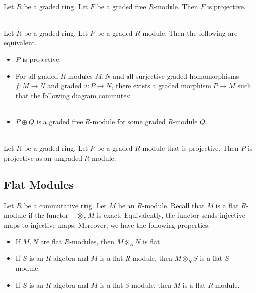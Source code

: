 \documentclass[a4paper]{article}
\begin{document}
\begin{lmm}{}{}\\
Let $R$ be a graded ring. Let $F$ be a graded free $R$-module. Then $F$ is projective. 
\end{lmm}

\begin{prp}{}{}\\
Let $R$ be a graded ring. Let $P$ be a graded $R$-module. Then the following are equivalent. 
\begin{itemize}
\item $P$ is projective. 
\item For all graded $R$-modules $M,N$ and all surjective graded homomorphisms $f:M\to N$ and graded $u:P\to N$, there exists a graded morphism $P\to M$ such that the following diagram commutes: \\
\\
\item $P\oplus Q$ is a graded free $R$-module for some graded $R$-module $Q$. 
\end{itemize}
\end{prp}

\begin{prp}{}{}\\
Let $R$ be a graded ring. Let $P$ be a graded $R$-module that is projective. Then $P$ is projective as an ungraded $R$-module. 
\end{prp}

\subsection{Flat Modules}
Let $R$ be a commutative ring. Let $M$ be an $R$-module. Recall that $M$ is a flat $R$-module if the functor $-\otimes_R M$ is exact. Equivalently, the functor sends injective maps to injective maps. Moreover, we have the following properties: 
\begin{itemize}
\item If $M,N$ are flat $R$-modules, then $M\otimes_RN$ is flat. 
\item If $S$ is an $R$-algebra and $M$ is a flat $R$-module, then $M\otimes_R S$ is a flat $S$-module. 
\item If $S$ is an $R$-algebra and $M$ is a flat $S$-module, then $M$ is a flat $R$-module. 
\end{itemize}
\end{document}
